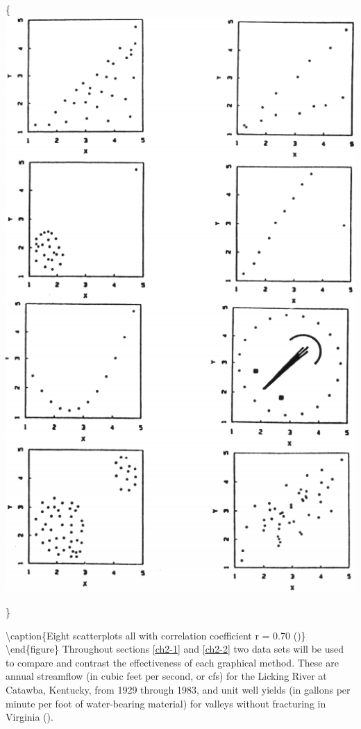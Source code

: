 \documentclass[]{book}
\begin{document}
\{\centering \includegraphics{figures/2_1}

\}

\textbackslash{}caption\{Eight scatterplots all with correlation coefficient r = 0.70 (\citet{chambers_graphical_1983})\}\label{fig:fig-2-1}
\textbackslash{}end\{figure\}
Throughout sections \ref{ch2-1} and \ref{ch2-2} two data sets will be used to compare and contrast the effectiveness of each graphical method. These are annual streamflow (in cubic feet per second, or cfs) for the Licking River at Catawba, Kentucky, from 1929 through 1983, and unit well yields (in gallons per minute per foot of water-bearing material) for valleys without fracturing in
Virginia (\citet{wright_effects_1985}).
\end{document}
